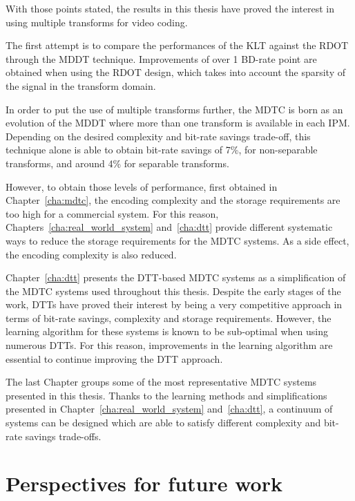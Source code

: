 \documentclass[11pt,a4paper,openright,twoside]{book}
\numberwithin{equation}{section} %
\numberwithin{figure}{section} %
\numberwithin{table}{section} %
\begin{document}
With those points stated, the results in this thesis have proved the interest
in using multiple transforms for video coding.

The first attempt is to compare the performances of the \ac{KLT} against the
\ac{RDOT} through the \ac{MDDT} technique.
Improvements of over 1 \ac{BD}-rate point are obtained when using the
\ac{RDOT} design, which takes into account the sparsity of the signal in the
transform domain.

In order to put the use of multiple transforms further, the \ac{MDTC} is born
as an evolution of the \ac{MDDT} where more than one transform is available in
each \ac{IPM}.
Depending on the desired complexity and bit-rate savings trade-off, this
technique alone is able to obtain bit-rate savings of 7\%, for non-separable
transforms, and around 4\% for separable transforms.

However, to obtain those levels of performance, first obtained in
Chapter~\ref{cha:mdtc}, the encoding complexity and the storage requirements
are too high for a commercial system.
For this reason, Chapters~\ref{cha:real_world_system} and~\ref{cha:dtt}
provide different systematic ways to reduce the storage requirements for the
\ac{MDTC} systems.
As a side effect, the encoding complexity is also reduced.

Chapter~\ref{cha:dtt} presents the \ac{DTT}-based \ac{MDTC} systems as a
simplification of the \ac{MDTC} systems used throughout this thesis.
Despite the early stages of the work, \acp{DTT} have proved their interest by
being a very competitive approach in terms of bit-rate savings, complexity and
storage requirements.
However, the learning algorithm for these systems is known to be sub-optimal
when using numerous \acp{DTT}.
For this reason, improvements in the learning algorithm are essential to
continue improving the \ac{DTT} approach.

The last Chapter groups some of the most representative \ac{MDTC} systems
presented in this thesis.
Thanks to the learning methods and simplifications presented in
Chapter~\ref{cha:real_world_system} and~\ref{cha:dtt}, a continuum of systems
can be designed which are able to satisfy different complexity and bit-rate
savings trade-offs.

\section*{Perspectives for future work}
\label{sec:perspectives_for_future_work}
\end{document}
